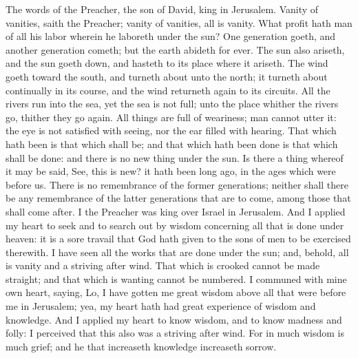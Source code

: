 


The words of the Preacher, the son of David, king in Jerusalem.  Vanity of vanities, saith the Preacher; vanity of vanities, all is vanity. What profit hath man of all his labor wherein he laboreth under the sun? One generation goeth, and another generation cometh; but the earth abideth for ever. The sun also ariseth, and the sun goeth down, and hasteth to its place where it ariseth. The wind goeth toward the south, and turneth about unto the north; it turneth about continually in its course, and the wind returneth again to its circuits. All the rivers run into the sea, yet the sea is not full; unto the place whither the rivers go, thither they go again. All things are full of weariness; man cannot utter it: the eye is not satisfied with seeing, nor the ear filled with hearing. That which hath been is that which shall be; and that which hath been done is that which shall be done: and there is no new thing under the sun. Is there a thing whereof it may be said, See, this is new? it hath been long ago, in the ages which were before us. There is no remembrance of the former generations; neither shall there be any remembrance of the latter generations that are to come, among those that shall come after.  I the Preacher was king over Israel in Jerusalem. And I applied my heart to seek and to search out by wisdom concerning all that is done under heaven: it is a sore travail that God hath given to the sons of men to be exercised therewith. I have seen all the works that are done under the sun; and, behold, all is vanity and a striving after wind. That which is crooked cannot be made straight; and that which is wanting cannot be numbered. I communed with mine own heart, saying, Lo, I have gotten me great wisdom above all that were before me in Jerusalem; yea, my heart hath had great experience of wisdom and knowledge. And I applied my heart to know wisdom, and to know madness and folly: I perceived that this also was a striving after wind. For in much wisdom is much grief; and he that increaseth knowledge increaseth sorrow. 

